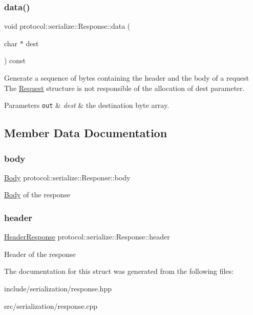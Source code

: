 \subsubsection{\texorpdfstring{data()}{data()}}
{\footnotesize\ttfamily void protocol\+::serialize\+::\+Response\+::data (\begin{DoxyParamCaption}\item[{char $\ast$}]{dest }\end{DoxyParamCaption}) const}



Generate a sequence of bytes containing the header and the body of a request The \hyperlink{structprotocol_1_1serialize_1_1_request}{Request} structure is not responsible of the allocation of dest parameter. 


\begin{DoxyParams}[1]{Parameters}
\mbox{\tt out}  & {\em dest} & the destination byte array. \\
\hline
\end{DoxyParams}


\subsection{Member Data Documentation}
\mbox{\label{structprotocol_1_1serialize_1_1_response_a6706ef7e0a22f2ba78e1b6ff12955568}} 
\subsubsection{\texorpdfstring{body}{body}}
{\footnotesize\ttfamily \hyperlink{classprotocol_1_1serialize_1_1_body}{Body} protocol\+::serialize\+::\+Response\+::body}

\hyperlink{classprotocol_1_1serialize_1_1_body}{Body} of the response \mbox{\label{structprotocol_1_1serialize_1_1_response_ad2391bc2916947b5ac734ddaa6570442}} 
\subsubsection{\texorpdfstring{header}{header}}
{\footnotesize\ttfamily \hyperlink{structprotocol_1_1serialize_1_1_header_response}{Header\+Response} protocol\+::serialize\+::\+Response\+::header}

Header of the response 

The documentation for this struct was generated from the following files\+:\begin{DoxyCompactItemize}
\item 
include/serialization/response.\+hpp\item 
src/serialization/response.\+cpp\end{DoxyCompactItemize}
